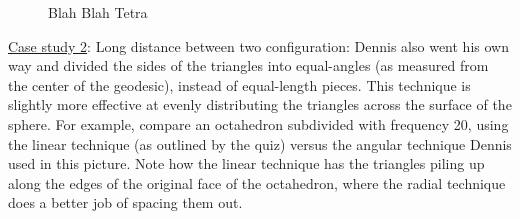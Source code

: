 \begin{center}
\begin{figure}[h]
\hfill
{}
\caption{Blah Blah Tetra}
\end{figure}
\end{center}

\noindent\uline{Case study 2}: Long distance between two configuration:
Dennis also went his own way and divided the sides of the triangles into equal-angles (as measured from the center of the geodesic), instead of equal-length pieces. This technique is slightly more effective at evenly distributing the triangles across the surface of the sphere. For example, compare an octahedron subdivided with frequency 20, using the linear technique (as outlined by the quiz) versus the angular technique Dennis used in this picture. Note how the linear technique has the triangles piling up along the edges of the original face of the octahedron, where the radial technique does a better job of spacing them out.\\

